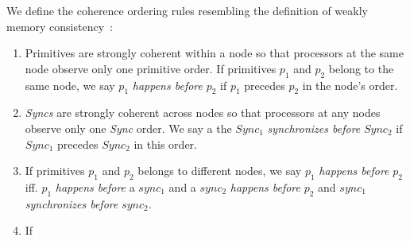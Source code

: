 \ifx{}\stale
We define the coherence ordering rules resembling the definition of weakly memory consistency~\cite{newdefinition_isca98}: 
\begin{enumerate}
    \item Primitives are strongly coherent within a node so that processors at the same node observe only one primitive order. If primitives $p_1$ and $p_2$ belong to the same node, we say $p_1$ \textit{happens before} $p_2$ if $p_1$ precedes $p_2$ in the node's order. 
    
    \item \textit{Syncs} are strongly coherent across nodes so that processors at any nodes observe only one \textit{Sync} order. We say a the $Sync_1$ \textit{synchronizes before} $Sync_2$ if $Sync_1$ precedes $Sync_2$ in this order.
    
    \item If primitives $p_1$ and $p_2$ belongs to different nodes, we say $p_1$ \textit{happens before} $p_2$ iff. $p_1$ \textit{happens before} a $sync_1$ and a $sync_2$ \textit{happens before} $p_2$ and $sync_1$ \textit{synchronizes before} $sync_2$. 
    
    \item If 
\end{enumerate}
\fi






